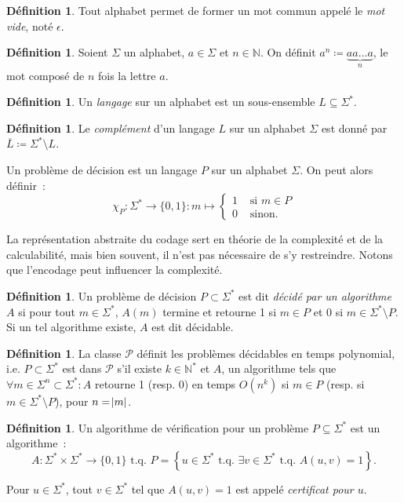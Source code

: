 \documentclass{article}
\theoremstyle{definition}
\newtheorem{déf}[thm]{Définition}
\theoremstyle{remark}
\newcommand{\N}{\mathbb N}
\newcommand{\tq}{\text{ t.q. }}
\begin{document}
	\begin{déf} Tout alphabet permet de former un mot commun appelé le \textit{mot vide}, noté $\epsilon$.
	\end{déf}

	\begin{déf} Soient $\Sigma$ un alphabet, $a \in \Sigma$ et $n \in \N$. On définit $a^n \coloneqq \underbrace {aa\ldots a}_{n}$, le mot composé de $n$ fois la
	lettre $a$.
	\end{déf}

	\begin{déf} Un \textit{langage} sur un alphabet est un sous-ensemble $L \subseteq \Sigma^*$.
	\end{déf}

	\begin{déf} Le \textit{complément} d'un langage $L$ sur un alphabet $\Sigma$ est donné par $\overline L \coloneqq \Sigma^* \setminus L$.
	\end{déf}

	Un problème de décision est un langage $P$ sur un alphabet $\Sigma$. On peut alors définir~:
	\[\chi_P : \Sigma^* \to \{0, 1\} : m \mapsto \begin{cases}1 &\text{ si } m \in P \\0 &\text{ sinon}.\end{cases}\]

	La représentation abstraite du codage sert en théorie de la complexité et de la calculabilité, mais bien souvent, il n'est pas nécessaire de s'y restreindre.
	Notons que l'encodage peut influencer la complexité.

	\begin{déf} Un problème de décision $P \subset \Sigma^*$ est dit \textit{décidé par un algorithme $A$} si pour tout $m \in \Sigma^*$,
	$A(m)$ termine et retourne 1 si $m \in P$ et 0 si $m \in \Sigma^* \setminus P$. Si un tel algorithme existe, $A$ est dit décidable.
	\end{déf}

	\begin{déf} La classe $\mathcal P$ définit les problèmes décidables en temps polynomial, i.e. $P \subset \Sigma^*$ est dans $\mathcal P$ s'il existe
	$k \in \N^*$ et $A$, un algorithme tels que $\forall m \in \Sigma^n \subset \Sigma^* : A$ retourne 1 (resp. 0) en temps $O(n^k)$ si
	$m \in P$ (resp. si $m \in \Sigma^* \setminus P$), pour $n = \abs m$.
	\end{déf}

	\begin{déf} Un algorithme de vérification pour un problème $P \subseteq \Sigma^*$ est un algorithme~:
	\[A : \Sigma^* \times \Sigma^* \to \{0, 1\} \tq P = \left\{u \in \Sigma^* \tq \exists v \in \Sigma^* \tq A(u, v) = 1\right\}.\]

	Pour $u \in \Sigma^*$, tout $v \in \Sigma^*$ tel que $A(u, v) = 1$ est appelé \textit{certificat pour $u$}.
	\end{déf}
\end{document}

